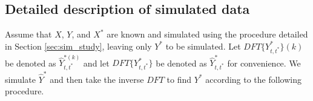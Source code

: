 
\subsection{Detailed description of simulated data}

Assume that $X$, $Y$, and $X^*$ are known and simulated using the procedure detailed in Section \ref{sec:sim_study}, leaving only $Y^*$ to be simulated. Let $DFT\{Y^*_{t,t^*}\}(k)$ be denoted as $\hat{Y}^{*(k)}_{t,t^*}$ and let $DFT\{Y^*_{t,t^*}\}$ be denoted as $\hat{Y}^*_{t,t^*}$ for convenience. We simulate $\hat Y^*$ and then take the inverse $DFT$ to find $Y^*$ according to the following procedure. 


